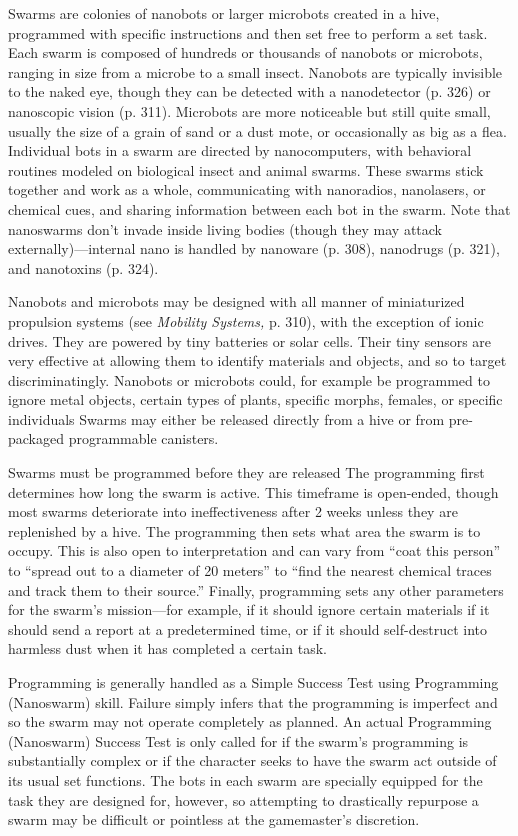 Swarms are colonies of nanobots or larger microbots 
created in a hive, programmed with specific instructions
and then set free to perform a set task. Each
swarm is composed of hundreds or thousands of 
nanobots or microbots, ranging in size from a microbe 
to a small insect. Nanobots are typically invisible to 
the naked eye, though they can be detected with a 
nanodetector (p. 326) or nanoscopic vision (p. 311). 
Microbots are more noticeable but still quite small, 
usually the size of a grain of sand or a dust mote, 
or occasionally as big as a flea. Individual bots in a 
swarm are directed by nanocomputers, with behavioral
routines modeled on biological insect and animal
swarms. These swarms stick together and work as a 
whole, communicating with nanoradios, nanolasers, 
or chemical cues, and sharing information between 
each bot in the swarm. Note that nanoswarms don't 
invade inside living bodies (though they may attack 
externally)—internal nano is handled by nanoware (p. 
308), nanodrugs (p. 321), and nanotoxins (p. 324).

Nanobots and microbots may be designed with 
all manner of miniaturized propulsion systems (see 
\textit{Mobility Systems,} p. 310), with the exception of ionic 
drives. They are powered by tiny batteries or solar 
cells. Their tiny sensors are very effective at allowing 
them to identify materials and objects, and so to target 
discriminatingly. Nanobots or microbots could, for example
be programmed to ignore metal objects, certain
types of plants, specific morphs, females, or specific individuals
Swarms may either be released directly from
a hive or from pre-packaged programmable canisters.

Swarms must be programmed before they are released
The programming first determines how long
the swarm is active. This timeframe is open-ended, 
though most swarms deteriorate into ineffectiveness 
after 2 weeks unless they are replenished by a hive. 
The programming then sets what area the swarm is 
to occupy. This is also open to interpretation and 
can vary from ``coat this person'' to ``spread out to a 
diameter of 20 meters'' to ``find the nearest chemical 
traces and track them to their source.'' Finally, programming
sets any other parameters for the swarm's
mission—for example, if it should ignore certain materials
if it should send a report at a predetermined
time, or if it should self-destruct into harmless dust 
when it has completed a certain task.

Programming is generally handled as a Simple 
Success Test using Programming (Nanoswarm) skill. 
Failure simply infers that the programming is imperfect
and so the swarm may not operate completely as
planned. An actual Programming (Nanoswarm) Success
Test is only called for if the swarm's programming
is substantially complex or if the character seeks to 
have the swarm act outside of its usual set functions. 
The bots in each swarm are specially equipped for the 
task they are designed for, however, so attempting 
to drastically repurpose a swarm may be difficult or 
pointless at the gamemaster's discretion.

